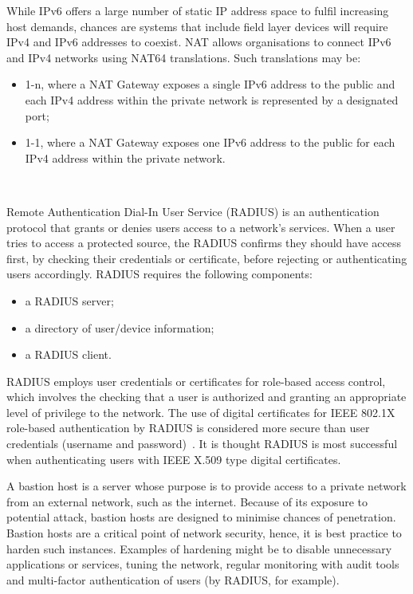 \documentclass[11pt, oneside]{book}   	%
\begin{document}
While IPv6 offers a large number of static IP address space to fulfil increasing host demands, chances are systems that include field layer devices will require IPv4 and IPv6 addresses to coexist.
NAT allows organisations to connect IPv6 and IPv4 networks using NAT64 translations. Such translations may be:
\begin{itemize}
	\item 1-n, where a NAT Gateway exposes a single IPv6 address to the public and each IPv4 address within the private network is represented by a designated port; 
	\item 1-1, where a NAT Gateway exposes one IPv6 address to the public for each IPv4 address within the private network.
\end{itemize}\

Remote Authentication Dial-In User Service (RADIUS) is an authentication protocol that grants or denies users access to a network’s services.
When a user tries to access a protected source, the RADIUS confirms they should have access first, by checking their credentials or certificate, before rejecting or authenticating users accordingly.
RADIUS requires the following components:
\begin{itemize}
	\item a RADIUS server; 
	\item a directory of user/device information;
	\item a RADIUS client.
\end{itemize}	
RADIUS employs user credentials or certificates for role-based access control, which involves the checking that a user is authorized and granting an appropriate level of privilege to the network.
The use of digital certificates for IEEE 802.1X role-based authentication by RADIUS is considered more secure than user credentials (username and password)~\cite{8021X}.
It is thought RADIUS is most successful when authenticating users with IEEE X.509 type digital certificates.~\cite{X509}\

A bastion host is a server whose purpose is to provide access to a private network from an external network, such as the internet.
Because of its exposure to potential attack, bastion hosts are designed to minimise chances of penetration.
Bastion hosts are a critical point of network security, hence, it is best practice to harden such instances.
Examples of hardening might be to disable unnecessary applications or services, tuning the network, regular monitoring with audit tools and multi-factor authentication of users (by RADIUS, for example).\
\end{document}
